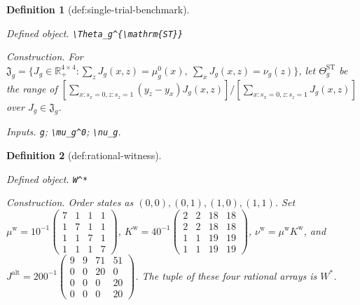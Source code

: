\documentclass{article}
\newtheorem{definition}{Definition}
\begin{document}
\begin{definition}[def:single-trial-benchmark]\label{def:single-trial-benchmark}
\par\smallskip\noindent\emph{Defined object.} \texttt{\textbackslash{}\allowbreak{}Theta\_\allowbreak{}g\textasciicircum{}\{\textbackslash{}\allowbreak{}mathrm\{ST\}\allowbreak{}\}\allowbreak{}}
\par\smallskip\noindent\emph{Construction.} For \(\mathfrak J_g=\{J_g\in\mathbb R_+^{4\times4}:\sum_zJ_g(x,z)=\mu_g^0(x),\ \sum_xJ_g(x,z)=\nu_g(z)\}\), let \(\Theta_g^{\mathrm{ST}}\) be the range of \([\sum_{x:s_x=0,z:s_z=1}(y_z-y_x)J_g(x,z)]/[\sum_{x:s_x=0,z:s_z=1}J_g(x,z)]\) over \(J_g\in\mathfrak J_g\).
\par\smallskip\noindent\emph{Inputs.} \texttt{g}; \texttt{\textbackslash{}\allowbreak{}mu\_\allowbreak{}g\textasciicircum{}0}; \texttt{\textbackslash{}\allowbreak{}nu\_\allowbreak{}g}.
\end{definition}

\begin{definition}[def:rational-witness]\label{def:rational-witness}
\par\smallskip\noindent\emph{Defined object.} \texttt{W\textasciicircum{}*}
\par\smallskip\noindent\emph{Construction.} Order states as \((0,0),(0,1),(1,0),(1,1)\). Set \(\mu^{\mathrm w}=10^{-1}\begin{pmatrix}7&1&1&1\\1&7&1&1\\1&1&7&1\\1&1&1&7\end{pmatrix}\), \(K^{\mathrm w}=40^{-1}\begin{pmatrix}2&2&18&18\\2&2&18&18\\1&1&19&19\\1&1&19&19\end{pmatrix}\), \(\nu^{\mathrm w}=\mu^{\mathrm w}K^{\mathrm w}\), and \(J^{\mathrm{alt}}=200^{-1}\begin{pmatrix}9&9&71&51\\0&0&20&0\\0&0&0&20\\0&0&0&20\end{pmatrix}\). The tuple of these four rational arrays is \(W^*\).
\end{definition}
\end{document}
